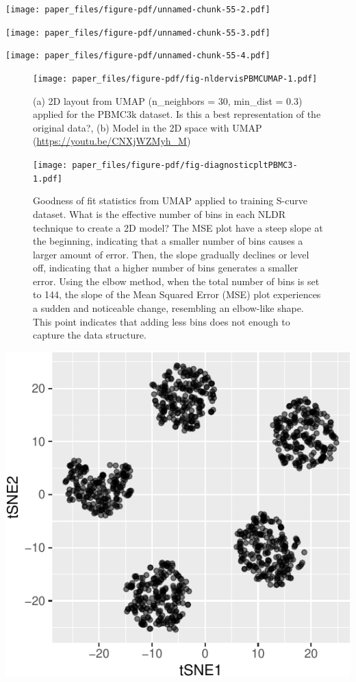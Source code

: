 \documentclass[
  12pt]{article}
\begin{document}
\texttt{[image: paper\_files/figure-pdf/unnamed-chunk-55-2.pdf]}

\texttt{[image: paper\_files/figure-pdf/unnamed-chunk-55-3.pdf]}

\texttt{[image: paper\_files/figure-pdf/unnamed-chunk-55-4.pdf]}

\begin{figure}[h]

{\centering \texttt{[image: paper\_files/figure-pdf/fig-nldervisPBMCUMAP-1.pdf]}

}

\caption{\label{fig-nldervisPBMCUMAP}(a) 2D layout from UMAP
(n\_neighbors = 30, min\_dist = 0.3) applied for the PBMC3k dataset. Is
this a best representation of the original data?, (b) Model in the 2D
space with UMAP (\url{https://youtu.be/CNXjWZMyh_M})}

\end{figure}

\begin{figure}

{\centering \texttt{[image: paper\_files/figure-pdf/fig-diagnosticpltPBMC3-1.pdf]}

}

\caption{\label{fig-diagnosticpltPBMC3}Goodness of fit statistics from
UMAP applied to training S-curve dataset. What is the effective number
of bins in each NLDR technique to create a 2D model? The MSE plot have a
steep slope at the beginning, indicating that a smaller number of bins
causes a larger amount of error. Then, the slope gradually declines or
level off, indicating that a higher number of bins generates a smaller
error. Using the elbow method, when the total number of bins is set to
144, the slope of the Mean Squared Error (MSE) plot experiences a sudden
and noticeable change, resembling an elbow-like shape. This point
indicates that adding less bins does not enough to capture the data
structure.}

\end{figure}

\includegraphics{paper_files/figure-pdf/unnamed-chunk-61-1.pdf}
\end{document}
